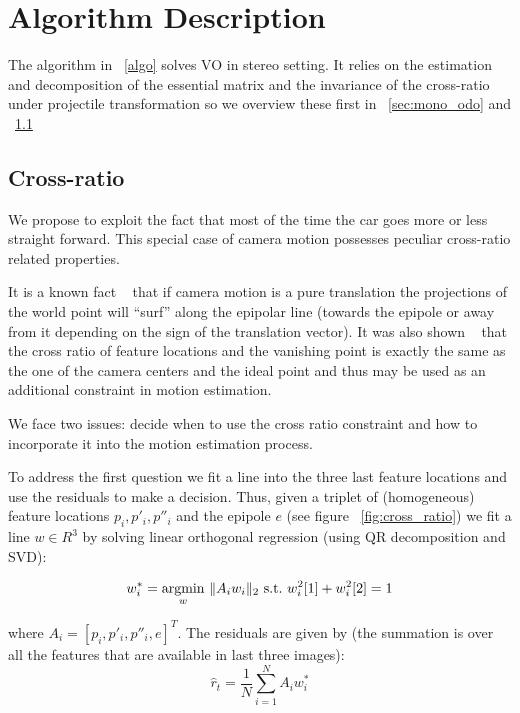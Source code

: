 \documentclass[10pt]{article}         %
\DeclarePairedDelimiter\norm{\lVert}{\rVert}%
\begin{document}
\section{Algorithm Description}

The algorithm in ~\ref{algo} solves VO in stereo setting. It relies on
the estimation and decomposition of the essential matrix and the
invariance of the cross-ratio under projectile transformation so we
overview these first in ~\ref{sec:mono_odo} and ~\ref{sec:cross_ratio}


\subsection{Cross-ratio}\label{sec:cross_ratio}

We propose to exploit the fact that most of the time the car goes more
or less straight forward.  This special case of camera motion
possesses peculiar cross-ratio related properties.

It is a known fact ~\cite{Hartley2004} that if camera motion is a pure
translation the projections of the world point will ``surf'' along the
epipolar line (towards the epipole or away from it depending on the
sign of the translation vector). It was also shown
~\cite{basri1999visual} that the cross ratio of feature locations and
the vanishing point is exactly the same as the one of the camera
centers and the ideal point and thus may be used as an additional
constraint in motion estimation.

We face two issues: decide when to use the cross ratio constraint and
how to incorporate it into the motion estimation process.

To address the first question we fit a line into the three last
feature locations and use the residuals to make a decision.  Thus,
given a triplet of (homogeneous) feature locations $p_i,p'_i,p''_i$ and the epipole
$e$ (see figure ~\ref{fig:cross_ratio}) we fit a line $w\in R^3$ by solving linear orthogonal regression (using QR decomposition and SVD):

\[
w_i^* = \underset{w}{\text{argmin}} \ \norm{A_iw_i}_2\ \text{s.t.}\
w^2_i[1]+w^2_i[2]=1
\]

where $A_i=[p_i,p'_i,p''_i,e]^T$.  The residuals are given by (the
summation is over all the features that are available in last three
images):
\begin{equation}\label{eq:puret}
  \hat{r}_t = \frac{1}{N} \sum_{i=1}^N A_iw_i^*
\end{equation}
\end{document}
